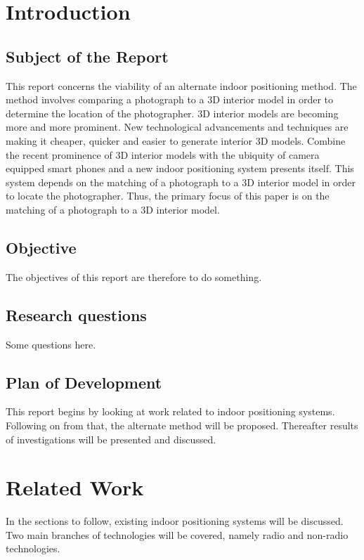 \documentclass[11pt,a4paper]{report}
\begin{document}
\newpage
\tableofcontents

\newpage
\listoffigures

\setcounter{page}{0}

\newpage
\chapter{Introduction}
	\section{Subject of the Report}
		This report concerns the viability of an alternate indoor positioning method. The method involves comparing a photograph to a 3D interior model in order to determine the location of the photographer. 3D interior models are becoming more and more prominent. New technological advancements and techniques are making it cheaper, quicker and easier to generate interior 3D models. Combine the recent prominence of 3D interior models with the ubiquity of camera equipped smart phones and a new indoor positioning system presents itself. This system depends on the matching of a photograph to a 3D interior model in order to locate the photographer. Thus, the primary focus of this paper is on the matching of a photograph to a 3D interior model.
	
	\section{Objective}
		The objectives of this report are therefore to do something.
		
	\section{Research questions}
		Some questions here.
	
	\section{Plan of Development}
		This report begins by looking at work related to indoor positioning systems. Following on from that, the alternate method will be proposed. Thereafter results of investigations will be presented and discussed.

\newpage
\chapter{Related Work}
	In the sections to follow, existing indoor positioning systems will be discussed. Two main branches of technologies will be covered, namely radio and non-radio technologies.
	
\end{document}
